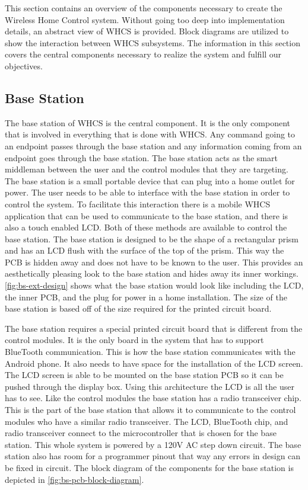 This section contains an overview of the components necessary to create the
Wireless Home Control system. Without going too deep into implementation
details, an abstract view of WHCS is provided. Block diagrams are utilized to
show the interaction between WHCS subsystems. The information in this section
covers the central components necessary to realize the system and fulfill our
objectives.

\subsection{Base Station}
The base station of WHCS is the central component. It is the only component
that is involved in everything that is done with WHCS. Any command going
to an endpoint passes through the base station and any information coming
from an endpoint goes through the base station. The base station acts as the
smart middleman between the user and the control modules that they are
targeting. The base station is a small portable device that can plug into a
home outlet for power. The user needs to be able to interface with the base station in order to control the
system. To facilitate this interaction there is a mobile WHCS application
that can be used to communicate to the base station, and there is also a
touch enabled LCD. Both of these methods are available to control the base
station. The base station is designed to be the shape of a rectangular prism and has an LCD flush with the surface of the top of the prism. This way the PCB
is hidden away and does not have to be known to the user. This provides
an aesthetically pleasing look to the base station and hides away its inner
workings. \autoref{fig:bs-ext-design} shows what the base station would look like
including the LCD, the inner PCB, and the plug for power in a home installation. The size of the base
station is based off of the size required for the printed circuit board.


{\color{black} The base station requires a special printed circuit board
that is different from the control modules. It is the only board in the
system that has to support BlueTooth communication. This is how the base
station communicates with the Android phone. It also needs to have
space for the installation of the LCD screen. The LCD screen is able to be
mounted on the base station PCB so it can be pushed through the display box.
Using this architecture the LCD is all the user has to see. Like the
control modules the base station has a radio transceiver chip. This is the part of the base station that allows it to communicate to the control
modules who have a similar radio transceiver. The LCD, BlueTooth chip, and
radio transceiver connect to the microcontroller that is chosen
for the base station. This whole system is powered by a 120V AC step down
circuit. The base station also has room for a
programmer pinout that way any errors in design can be fixed in circuit. The
block diagram of the components for the base station is depicted in
\autoref{fig:bs-pcb-block-diagram}.}

